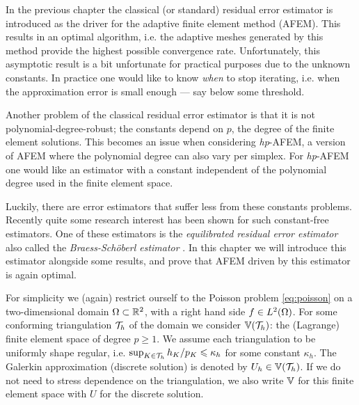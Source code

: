 \documentclass[thesis.tex]{subfiles}
\begin{document}
In the previous chapter the classical (or standard) residual error estimator is introduced as the driver for the
adaptive finite element method (AFEM). This results in an optimal algorithm, i.e. the adaptive meshes
generated by this method provide the highest possible convergence rate. Unfortunately, this asymptotic result
is a bit unfortunate for practical purposes due to the unknown constants. In practice
one would like to know \emph{when} to stop iterating, i.e. when the approximation error is small enough --- say
below some threshold. 

Another problem of the classical residual error estimator is that it is not polynomial-degree-robust; 
the constants depend on $p$, the degree of the finite element solutions. This becomes an issue
when considering \emph{hp}-AFEM, a version of AFEM where the polynomial degree can also vary
per simplex. For \emph{hp}-AFEM one would like an estimator with a constant independent of the polynomial degree
used in the finite element space.

Luckily, there are error estimators that suffer less from these constants problems. Recently quite
some research interest has been shown for such constant-free estimators. One of these estimators is the
\emph{equilibrated residual error estimator} also called the \emph{Braess-Sch\"oberl estimator} \cite{braessequil, braessequilrobust,ernequil}.
In this chapter we will introduce this estimator alongside some results, and prove that AFEM driven 
by this estimator is again optimal.

For simplicity we (again) restrict ourself to the Poisson problem \eqref{eq:poisson} on a two-dimensional domain $\Omega \subset \mathbb{R}^2$,
with a right hand side $f \in L^2(\Omega)$. For some conforming triangulation $\mathcal{T}_h$ of the domain we consider $\mathbb{V}(\mathcal{T}_h)$: the (Lagrange) finite element space of degree $p\geq 1$. We assume each triangulation to be uniformly shape regular, i.e. $\sup_{K \in \mathcal{T}_h} h_K/p_K \leqslant \kappa_{h}$ for some constant $\kappa_{h}$.
The Galerkin approximation (discrete solution) is denoted by $U_h \in \mathbb{V}(\mathcal{T}_h)$.
If we do not need to stress dependence on the triangulation, we also write $\mathbb{V}$ for this finite element space with $U$ for the discrete
solution.
\end{document}
